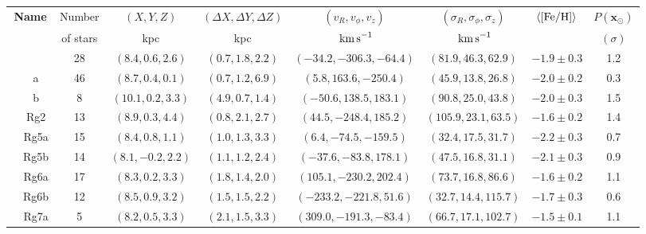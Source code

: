 \begin{table}[t!] 
\begin{tabularx}{0.98\textwidth}{cc|ccccccc}
\hline\hline
 \multicolumn{2}{c|}{{\bf Name}}       & Number & $(X,Y,Z)$ & $(\Delta X,\Delta Y,\Delta Z)$ & $(v_R,v_\phi,v_z)$ & $(\sigma_R,\sigma_\phi,\sigma_z) $ & \quad $\langle [{\rm Fe}/{\rm H}] \rangle$ \quad        & \quad$P(\mathbf{x}_\odot)$\\
     &  &  of stars & kpc & kpc \quad\quad& $\textrm{ km \!s}^{-1}$   \quad    & $\textrm{ km \!s}^{-1} $ \quad &   &    $(\sigma)$   \\
\hline\hline  \parbox[t]{5mm}{} &        & 28        & $(8.4,0.6,2.6)$   & $(0.7,1.8,2.2)$                      & $(-34.2,-306.3,-64.4)$   & $(81.9,46.3,62.9)$                & $-1.9\pm 0.3$ & 1.2 \\
\hline\hline  \parbox[t]{5mm}{} & a      & 46        & $(8.7,0.4,0.1)$   & $(0.7,1.2,6.9)$                      & $(5.8,163.6,-250.4)$     & $(45.9,13.8,26.8)$                & $-2.0\pm 0.2$ & 0.3 \\
& b      & 8        & $(10.1,0.2,3.3)$   & $(4.9,0.7,1.4)$                      & $(-50.6,138.5,183.1)$    & $(90.8,25.0,43.8)$                & $-2.0\pm 0.3$ & 1.5 \\
\hline\hline \parbox[t]{5mm}{} & Rg2      & 13        & $(8.9,0.3,4.4)$   & $(0.8,2.1,2.7)$                      & $(44.5,-248.4,185.2)$    & $(105.9,23.1,63.5)$               & $-1.6\pm 0.2$ & 1.4 \\
& Rg5a     & 15        & $(8.4,0.8,1.1)$   & $(1.0,1.3,3.3)$                      & $(6.4,-74.5,-159.5)$     & $(32.4,17.5,31.7)$                & $-2.2\pm 0.3$ & 0.7 \\
& Rg5b     & 14        & $(8.1,-0.2,2.2)$  & $(1.1,1.2,2.4)$                      & $(-37.6,-83.8,178.1)$    & $(47.5,16.8,31.1)$                & $-2.1\pm 0.3$ & 0.9 \\
& Rg6a     & 17        & $(8.3,0.2,3.3)$   & $(1.8,1.4,2.0)$                      & $(105.1,-230.2,202.4)$   & $(73.7,16.8,86.6)$                & $-1.6\pm 0.2$ & 1.1 \\
& Rg6b     & 12        & $(8.5,0.9,3.2)$   & $(1.5,1.5,2.2)$                      & $(-233.2,-221.8,51.6)$   & $(32.7,14.4,115.7)$               & $-1.7\pm 0.3$ & 0.6 \\
& Rg7a     & 5         & $(8.2,0.5,3.3)$   & $(2.1,1.5,3.3)$                      & $(309.0,-191.3,-83.4)$   & $(66.7,17.1,102.7)$               & $-1.5\pm 0.1$ & 1.1 \\

\end{tabularx}
\end{table}
